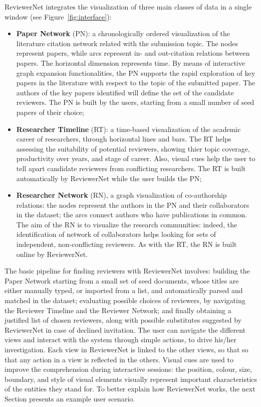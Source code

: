 ReviewerNet integrates the visualization of three main classes of data in a single window (see Figure~\ref{fig:interface}):

\begin{itemize}
\item  {\bf Paper Network} (PN): a chronologically ordered visualization of the literature citation network related with the submission topic. The nodes represent papers, while arcs represent in- and out-citation relations between papers. The horizontal dimension represents time. By means of interactive graph expansion functionalities, the PN supports the rapid exploration of key papers in the literature with respect to the topic of the submitted paper. The authors of the key papers identified will define the set of the candidate reviewers. The PN is built by the users, starting from a small number of seed papers of their choice;
\item  {\bf Researcher Timeline} (RT): a time-based visualization of the academic career of researchers, through horizontal lines and bars. The RT helps assessing the suitability of potential reviewers, showing thier topic coverage, productivity over years, and stage of career. Also, visual cues help the user to tell apart candidate reviewers from conflicting researchers. The RT is built automatically by ReviewerNet while the user builds the PN;
\item  {\bf Researcher Network} (RN), a graph visualization of co-authorship relations: the nodes represent the authors in the PN and their collaborators in the dataset; the arcs connect authors who have publications in common. The aim of the RN is to visualize the research communities: indeed, the identification of network of collaborators helps looking for sets of independent, non-conflicting reviewers. As with the RT, the RN is built online by ReviewerNet.
\end{itemize}
%
The basic pipeline for finding reviewers with ReviewerNet involves: building the Paper Network starting from a small set of seed documents, whose titles are either manually typed, or imported from a list, and automatically parsed and matched in the dataset; evaluating possible choices of reviewers, by navigating the Reviewer Timeline and the Reviewer Network; and finally obtaining a justified list of chosen reviewers, along with possible substitutes suggested by ReviewerNet in case of declined invitation. The user can navigate the different views and interact with the system through simple actions, to drive his/her investigation. Each view in ReviewerNet is linked to the other views, so that so that any action in a view is reflected in the others. Visual cues are used to improve the comprehension during interactive sessions: the position, colour, size, boundary, and style of visual elements visually represent important characteristics of the entities they stand for. To better explain how ReviewerNet works, the next Section presents an example user scenario. %

